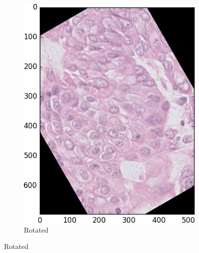 \documentclass[a4paper,10pt]{article}
\begin{document}
\begin{figure}
\begin{multicols}{3}
\begin{subfigure}{0.33\textwidth}
    \includegraphics[width=\linewidth]{rot.png}\par 
     \caption{Rotated}
     \label{fig:rot}
	\end{subfigure}%
\end{multicols}
\begin{multicols}{3}


\end{multicols}
\end{figure}
\end{document}
